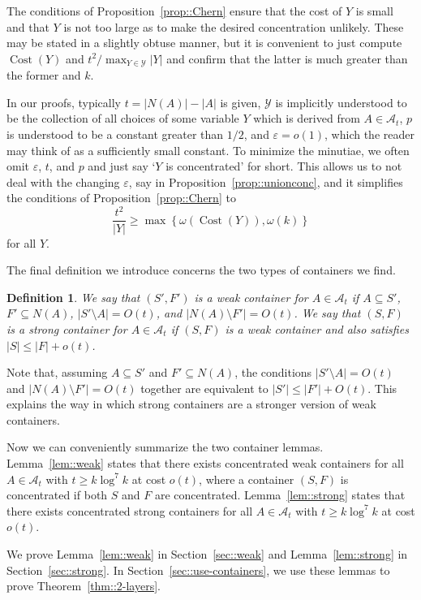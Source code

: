 \documentclass[12pt]{article}
\newcommand{\ep}{\varepsilon}
\newcommand{\A}{\mathcal{A}}
\newcommand{\Y}{\mathcal{Y}}
\DeclareMathOperator{\cost}{Cost}
\newtheorem{definition}[theorem]{Definition}
\begin{document}
The conditions of Proposition~\ref{prop::Chern} ensure that the cost of $Y$ is small and that $Y$ is not too large as to make the desired concentration unlikely. These may be stated in a slightly obtuse manner, but it is convenient to just compute $\cost(Y)$ and $t^2 / \max_{Y\in\Y} |Y|$ and confirm that the latter is much greater than the former and $k$.

In our proofs, typically $t=|N(A)|-|A|$ is given, $\mathcal{Y}$ is implicitly understood to be the collection of all choices of some variable $Y$ which is derived from $A \in \A_t$, $p$ is understood to be a constant greater than $1/2$, and $\ep = o(1)$, which the reader may think of as a sufficiently small constant. To minimize the minutiae, we often omit $\ep$, $t$, and $p$ and just say `$Y$ is concentrated' for short. This allows us to not deal with the changing $\ep$, say in Proposition~\ref{prop::unionconc}, and it simplifies the conditions of Proposition~\ref{prop::Chern} to
\[ \frac{t^2}{|Y|} \geq \max\left\{\omega(\cost(Y)), \omega(k)\right\} \]
for all $Y$.

The final definition we introduce concerns the two types of containers we find.
\begin{definition}
We say that $(S', F')$ is a \emph{weak container} for $A \in \A_t$ if $A \subseteq S'$, $F' \subseteq N(A)$, $|S' \setminus A| = O(t)$, and $|N(A) \setminus F'| = O(t)$. We say that $(S,F)$ is a \emph{strong container} for $A \in \A_t$ if $(S,F)$ is a weak container and also satisfies $|S| \leq |F| + o(t)$.
\end{definition}
Note that, assuming $A \subseteq S'$ and $F' \subseteq N(A)$, the conditions $|S' \setminus A| = O(t)$ and $|N(A) \setminus F'| = O(t)$ together are equivalent to $|S'| \leq |F'| + O(t)$. This explains the way in which strong containers are a stronger version of weak containers.

Now we can conveniently summarize the two container lemmas. Lemma~\ref{lem::weak} states that there exists concentrated weak containers for all $A \in \A_t$ with $t \geq k\log^7 k$ at cost $o(t)$, where a container $(S,F)$ is concentrated if both $S$ and $F$ are concentrated. Lemma~\ref{lem::strong} states that there exists concentrated strong containers for all $A \in \A_t$ with $t \geq k\log^7 k$ at cost $o(t)$.

We prove Lemma~\ref{lem::weak} in Section~\ref{sec::weak} and Lemma~\ref{lem::strong} in Section~\ref{sec::strong}. In Section~\ref{sec::use-containers}, we use these lemmas to prove Theorem~\ref{thm::2-layers}.
\end{document}
